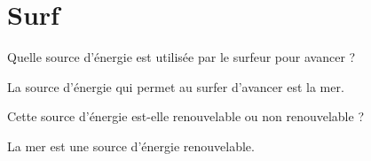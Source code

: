 \section{Surf}\label{ex:surf}

\begin{questions}
	\question Quelle source d'énergie est utilisée par le surfeur pour avancer ?
		\begin{solution}
			La source d'énergie qui permet au surfer d'avancer est la mer.
		\end{solution}
		
		
		
	
	\question Cette source d'énergie est-elle renouvelable ou non renouvelable ?
		\begin{solution}
			La mer est une source d'énergie renouvelable.
		\end{solution}
\end{questions}